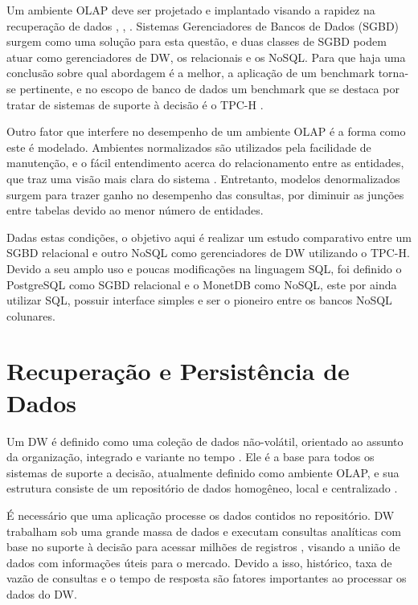 \documentclass[12pt]{article}
\begin{document}
Um ambiente OLAP deve ser projetado e implantado visando a rapidez na recuperação de dados \cite{wrembel2007data}, 
\cite{codd1998providing}, \cite{kimball2002dw}. Sistemas Gerenciadores de Bancos de Dados (SGBD) surgem como uma solução 
para esta questão, e duas classes de SGBD podem atuar como gerenciadores de DW, os relacionais e os NoSQL. 
Para que haja uma conclusão sobre qual abordagem é a melhor, a aplicação de um benchmark torna-se pertinente, 
e no escopo de banco de dados um benchmark que se destaca por tratar de sistemas de suporte à decisão é o TPC-H \cite{tpch2017page}. 

Outro fator que interfere no desempenho de um ambiente OLAP é a forma como este é modelado. 
Ambientes normalizados são utilizados pela facilidade de manutenção,
e o fácil entendimento acerca do relacionamento entre as entidades, que traz uma visão mais clara do sistema \cite{bax2003modelagem}. 
Entretanto, modelos denormalizados surgem para trazer ganho no desempenho das consultas, por diminuir 
as junções entre tabelas devido ao menor número de entidades.

Dadas estas condições, o objetivo aqui é realizar um estudo comparativo entre um SGBD relacional e outro NoSQL 
como gerenciadores de DW utilizando o TPC-H. Devido a seu amplo uso e poucas modificações na linguagem SQL, foi definido o PostgreSQL 
como SGBD relacional e o MonetDB como NoSQL, este por ainda utilizar SQL, possuir interface simples e ser o pioneiro 
entre os bancos NoSQL colunares.

\section{Recuperação e Persistência de Dados}

Um DW é definido como uma coleção de dados não-volátil, orientado ao assunto da organização, 
integrado e variante no tempo \cite{inmon2005building}. Ele é a base para todos os sistemas de 
suporte a decisão, atualmente definido como ambiente OLAP, e sua estrutura consiste de um 
repositório de dados homogêneo, local e centralizado \cite{wrembel2007data}.

É necessário que uma aplicação processe os dados contidos no repositório. DW trabalham sob uma grande 
massa de dados e executam consultas analíticas com base no suporte à decisão para acessar milhões de registros 
\cite{chaudhuri1997overview}, visando a união de dados com informações úteis para o mercado. Devido a isso, histórico, 
taxa de vazão de consultas e o tempo de resposta são fatores importantes ao processar os dados do DW.
\end{document}

